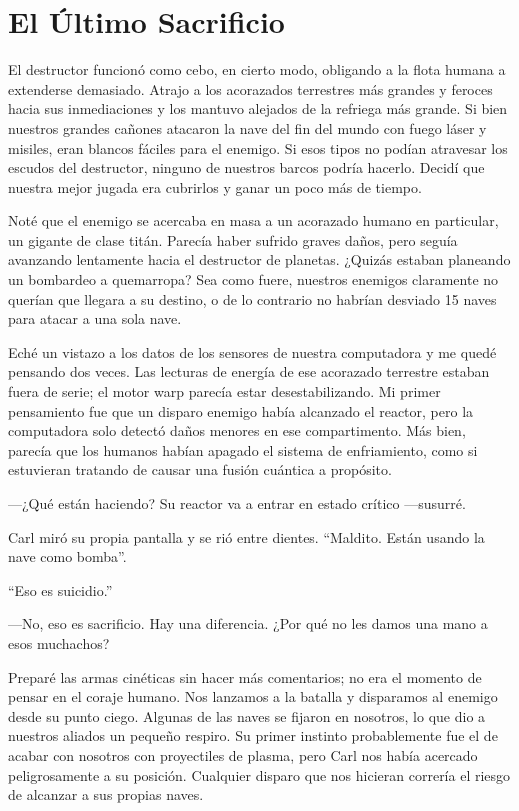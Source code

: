 \chapter{El Último Sacrificio}\label{sec:el-ultimo-sacrificio}

El destructor funcionó como cebo, en cierto modo, obligando a la flota humana a extenderse demasiado. Atrajo a los acorazados terrestres más grandes y feroces hacia sus inmediaciones y los mantuvo alejados de la refriega más grande. Si bien nuestros grandes cañones atacaron la nave del fin del mundo con fuego láser y misiles, eran blancos fáciles para el enemigo. Si esos tipos no podían atravesar los escudos del destructor, ninguno de nuestros barcos podría hacerlo. Decidí que nuestra mejor jugada era cubrirlos y ganar un poco más de tiempo.

Noté que el enemigo se acercaba en masa a un acorazado humano en particular, un gigante de clase titán. Parecía haber sufrido graves daños, pero seguía avanzando lentamente hacia el destructor de planetas. ¿Quizás estaban planeando un bombardeo a quemarropa? Sea como fuere, nuestros enemigos claramente no querían que llegara a su destino, o de lo contrario no habrían desviado 15 naves para atacar a una sola nave.

Eché un vistazo a los datos de los sensores de nuestra computadora y me quedé pensando dos veces. Las lecturas de energía de ese acorazado terrestre estaban fuera de serie; el motor warp parecía estar desestabilizando. Mi primer pensamiento fue que un disparo enemigo había alcanzado el reactor, pero la computadora solo detectó daños menores en ese compartimento. Más bien, parecía que los humanos habían apagado el sistema de enfriamiento, como si estuvieran tratando de causar una fusión cuántica a propósito.

—¿Qué están haciendo? Su reactor va a entrar en estado crítico —susurré.

Carl miró su propia pantalla y se rió entre dientes. ``Maldito. Están usando la nave como bomba''.

``Eso es suicidio.''


—No, eso es sacrificio. Hay una diferencia. ¿Por qué no les damos una mano a esos muchachos?

Preparé las armas cinéticas sin hacer más comentarios; no era el momento de pensar en el coraje humano. Nos lanzamos a la batalla y disparamos al enemigo desde su punto ciego. Algunas de las naves se fijaron en nosotros, lo que dio a nuestros aliados un pequeño respiro. Su primer instinto probablemente fue el de acabar con nosotros con proyectiles de plasma, pero Carl nos había acercado peligrosamente a su posición. Cualquier disparo que nos hicieran correría el riesgo de alcanzar a sus propias naves.

